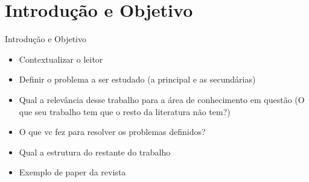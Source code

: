 \section{Introdução e Objetivo}

\begin{frame}	
	\begin{block}{Introdução e Objetivo}
		 \begin{itemize}
			  \item Contextualizar o leitor			
			  \item Definir o problema a ser estudado (a principal e as secundárias)
			  \item Qual a relevância desse trabalho para a área de conhecimento em questão (O que seu trabalho tem que o resto da literatura não tem?)
			  \item O que vc fez para resolver os problemas definidos?
			  \item Qual a estrutura do restante do trabalho
			  \item Exemplo de paper da revista \href{https://www.nature.com/scitable/topicpage/scientific-papers-13815490}{\color{blue}{Nature}} 
		  \end{itemize}
	\end{block}
\end{frame}
